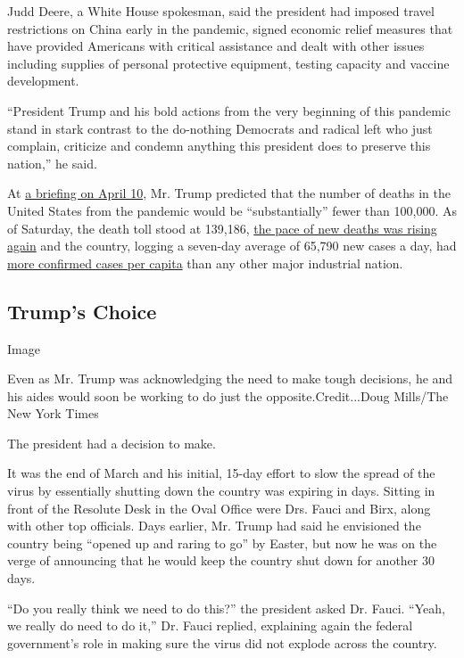 Judd Deere, a White House spokesman, said the president had imposed
travel restrictions on China early in the pandemic, signed economic
relief measures that have provided Americans with critical assistance
and dealt with other issues including supplies of personal protective
equipment, testing capacity and vaccine development.

``President Trump and his bold actions from the very beginning of this
pandemic stand in stark contrast to the do-nothing Democrats and radical
left who just complain, criticize and condemn anything this president
does to preserve this nation,'' he said.

At
\href{https://www.whitehouse.gov/briefings-statements/remarks-president-trump-vice-president-pence-members-coronavirus-task-force-press-briefing-24/}{a
briefing on April 10}, Mr. Trump predicted that the number of deaths in
the United States from the pandemic would be ``substantially'' fewer
than 100,000. As of Saturday, the death toll stood at 139,186,
\href{https://www.nytimes3xbfgragh.onion/interactive/2020/07/17/us/coronavirus-deaths.html}{the
pace of new deaths was rising again} and the country, logging a
seven-day average of 65,790 new cases a day, had
\href{https://www.nytimes3xbfgragh.onion/interactive/2020/world/coronavirus-maps.html}{more
confirmed cases per capita} than any other major industrial nation.

\hypertarget{trumps-choice}{%
\subsection{Trump's Choice}\label{trumps-choice}}

Image

Even as Mr. Trump was acknowledging the need to make tough decisions, he
and his aides would soon be working to do just the
opposite.Credit...Doug Mills/The New York Times

The president had a decision to make.

It was the end of March and his initial, 15-day effort to slow the
spread of the virus by essentially shutting down the country was
expiring in days. Sitting in front of the Resolute Desk in the Oval
Office were Drs. Fauci and Birx, along with other top officials. Days
earlier, Mr. Trump had said he envisioned the country being ``opened up
and raring to go'' by Easter, but now he was on the verge of announcing
that he would keep the country shut down for another 30 days.

``Do you really think we need to do this?'' the president asked Dr.
Fauci. ``Yeah, we really do need to do it,'' Dr. Fauci replied,
explaining again the federal government's role in making sure the virus
did not explode across the country.

